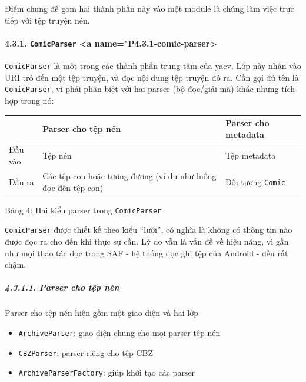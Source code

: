\documentclass[
]{article}
\begin{document}
Điểm chung để gom hai thành phần này vào một module là chúng làm việc
trực tiếp với tệp truyện nén.

\hypertarget{comicparser-a-namep4.3.1-comic-parser}{%
\paragraph{\texorpdfstring{4.3.1. \texttt{ComicParser} \textless a
name="P4.3.1-comic-parser>}{4.3.1. ComicParser \textless a name="P4.3.1-comic-parser>}}\label{comicparser-a-namep4.3.1-comic-parser}}

\texttt{ComicParser} là một trong các thành phần trung tâm của yacv. Lớp
này nhận vào URI trỏ đến một tệp truyện, và đọc nội dung tệp truyện đó
ra. Cần gọi đủ tên là \texttt{ComicParser}, vì phải phân biệt với hai
parser (bộ đọc/giải mã) khác nhưng tích hợp trong nó:

\begin{longtable}[]{@{}
  >{\raggedright\arraybackslash}p{}
  >{\raggedright\arraybackslash}p{}
  >{\raggedright\arraybackslash}p{}@{}}
\toprule
& Parser cho tệp nén & Parser cho metadata \\
\midrule
\endhead
Đầu vào & Tệp nén & Tệp metadata \\
Đầu ra & Các tệp con hoặc tương đương (ví dụ như luồng đọc đến tệp con)
& Đối tượng \texttt{Comic} \\
\bottomrule
\end{longtable}

Bảng 4: Hai kiểu parser trong \texttt{ComicParser}

\texttt{ComicParser} được thiết kế theo kiểu ``lười'', có nghĩa là không
có thông tin nào được đọc ra cho đến khi thực sự cần. Lý do vẫn là vấn
đề về hiệu năng, vì gần như mọi thao tác đọc trong SAF - hệ thống đọc
ghi tệp của Android - đều rất chậm.

\hypertarget{parser-cho-tux1ec7p-nuxe9n}{%
\subparagraph{4.3.1.1. Parser cho tệp
nén}\label{parser-cho-tux1ec7p-nuxe9n}}

Parser cho tệp nén hiện gồm một giao diện và hai lớp

\begin{itemize}
\item
  \texttt{ArchiveParser}: giao diện chung cho mọi parser tệp nén
\item
  \texttt{CBZParser}: parser riêng cho tệp CBZ
\item
  \texttt{ArchiveParserFactory}: giúp khởi tạo các parser
\end{itemize}
\end{document}
